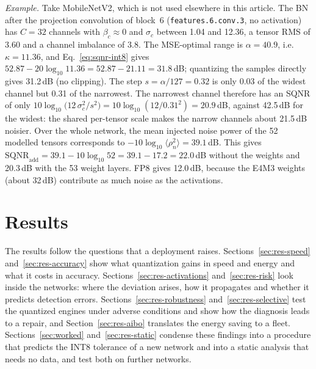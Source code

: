 \documentclass[pdflatex,sn-mathphys-num]{sn-jnl}%
\theoremstyle{thmstyleone}%
\theoremstyle{thmstyletwo}%
\theoremstyle{thmstylethree}%
\begin{document}
\emph{Example.} Take MobileNetV2, which is not used elsewhere in this article. The BN after the projection convolution of block~6 (\texttt{features.6.conv.3}, no activation) has $C=32$ channels with $\beta_c\approx0$ and $\sigma_c$ between 1.04 and 12.36, a tensor RMS of 3.60 and a channel imbalance of 3.8. The MSE-optimal range is $\alpha=40.9$, i.e.\ $\kappa=11.36$, and Eq.~\eqref{eq:sqnr-int8} gives $52.87-20\log_{10}11.36=52.87-21.11=31.8$\,dB; quantizing the samples directly gives 31.2\,dB (no clipping). The step $s=\alpha/127=0.32$ is only 0.03 of the widest channel but 0.31 of the narrowest. The narrowest channel therefore has an SQNR of only $10\log_{10}\bigl(12\,\sigma_c^2/s^2\bigr)=10\log_{10}(12/0.31^2)=20.9$\,dB, against 42.5\,dB for the widest: the shared per-tensor scale makes the narrow channels about 21.5\,dB noisier. Over the whole network, the mean injected noise power of the 52 modelled tensors corresponds to $-10\log_{10}\langle\rho_n^2\rangle=39.1$\,dB. This gives $\mathrm{SQNR}_\text{add}=39.1-10\log_{10}52=39.1-17.2=22.0$\,dB without the weights and 20.3\,dB with the 53 weight layers. FP8 gives 12.0\,dB, because the E4M3 weights (about 32\,dB) contribute as much noise as the activations.

\section{Results}\label{sec:results}

The results follow the questions that a deployment raises. Sections~\ref{sec:res-speed} and~\ref{sec:res-accuracy} show what quantization gains in speed and energy and what it costs in accuracy. Sections~\ref{sec:res-activations} and~\ref{sec:res-risk} look inside the networks: where the deviation arises, how it propagates and whether it predicts detection errors. Sections~\ref{sec:res-robustness} and~\ref{sec:res-selective} test the quantized engines under adverse conditions and show how the diagnosis leads to a repair, and Section~\ref{sec:res-aibo} translates the energy saving to a fleet. Sections~\ref{sec:worked} and~\ref{sec:res-static} condense these findings into a procedure that predicts the INT8 tolerance of a new network and into a static analysis that needs no data, and test both on further networks.
\end{document}
